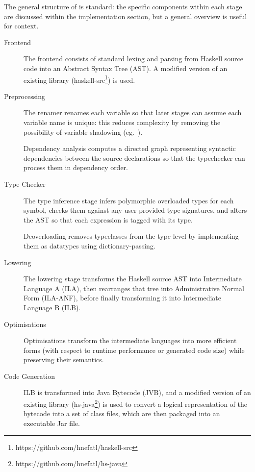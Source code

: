 \documentclass[dissertation.tex]{subfiles}
\begin{document}
{
    The general structure of \compilername is standard: the specific components within each stage are discussed within the implementation section, but a general overview is useful for context.

    \begin{description}
    \item[Frontend]
    {
        \hfill

        The frontend consists of standard lexing and parsing from Haskell source code into an Abstract Syntax Tree (AST). A modified version of an existing library (haskell-src\footnote{https://github.com/hnefatl/haskell-src}) is used.

    }
    \item[Preprocessing]
    {
        \hfill

        The renamer renames each variable so that later stages can assume each variable name is unique: this reduces complexity by removing the possibility of variable shadowing (eg.\ ). 

        Dependency analysis computes a directed graph representing syntactic dependencies between the source declarations so that the typechecker can process them in dependency order.
    }
    \item[Type Checker]
    {
        \hfill

        The type inference stage infers polymorphic overloaded types for each symbol, checks them against any user-provided type signatures, and alters the AST so that each expression is tagged with its type.

        Deoverloading removes typeclasses from the type-level by implementing them as datatypes using dictionary-passing.
    }
    \item[Lowering]
    {
        \hfill

        The lowering stage transforms the Haskell source AST into Intermediate Language A (ILA), then rearranges that tree into Administrative Normal Form (ILA-ANF), before finally transforming it into Intermediate Language B (ILB).
    }
    \item[Optimisations]
    {
        \hfill

        Optimisations transform the intermediate languages into more efficient forms (with respect to runtime performance or generated code size) while preserving their semantics.
    }
    \item[Code Generation]
    {
        \hfill

        ILB is transformed into Java Bytecode (JVB), and a modified version of an existing library (hs-java\footnote{https://github.com/hnefatl/hs-java}) is used to convert a logical representation of the bytecode into a set of class files, which are then packaged into an executable Jar file.
    }
    \end{description}
}
\end{document}

